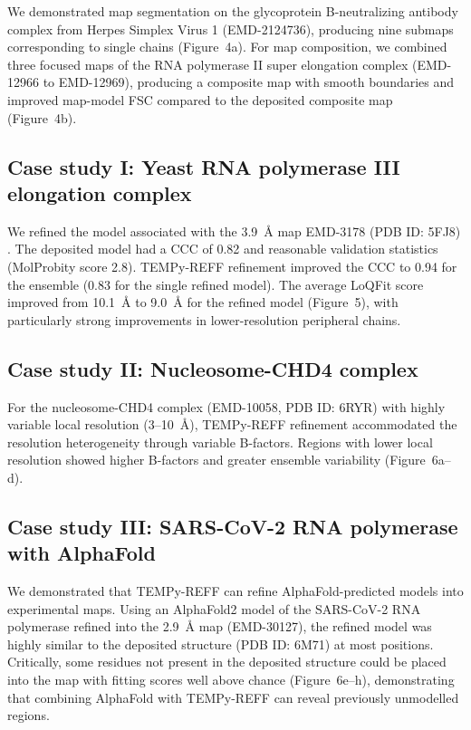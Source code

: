 \documentclass[11pt]{article}
\begin{document}
We demonstrated map segmentation on the glycoprotein B-neutralizing antibody complex from Herpes Simplex Virus 1 (EMD-2124736), producing nine submaps corresponding to single chains (Figure~4a). For map composition, we combined three focused maps of the RNA polymerase II super elongation complex (EMD-12966 to EMD-12969), producing a composite map with smooth boundaries and improved map-model FSC compared to the deposited composite map (Figure~4b).

\subsection{Case study I: Yeast RNA polymerase III elongation complex}

We refined the model associated with the 3.9~\AA{} map EMD-3178 (PDB ID: 5FJ8) \citep{hoffmann2022}. The deposited model had a CCC of 0.82 and reasonable validation statistics (MolProbity score 2.8). TEMPy-REFF refinement improved the CCC to 0.94 for the ensemble (0.83 for the single refined model). The average LoQFit score improved from 10.1~\AA{} to 9.0~\AA{} for the refined model (Figure~5), with particularly strong improvements in lower-resolution peripheral chains.

\subsection{Case study II: Nucleosome-CHD4 complex}

For the nucleosome-CHD4 complex (EMD-10058, PDB ID: 6RYR) with highly variable local resolution (3--10~\AA{}), TEMPy-REFF refinement accommodated the resolution heterogeneity through variable B-factors. Regions with lower local resolution showed higher B-factors and greater ensemble variability (Figure~6a--d).

\subsection{Case study III: SARS-CoV-2 RNA polymerase with AlphaFold}

We demonstrated that TEMPy-REFF can refine AlphaFold-predicted models \citep{jumper2021} into experimental maps. Using an AlphaFold2 model of the SARS-CoV-2 RNA polymerase refined into the 2.9~\AA{} map (EMD-30127), the refined model was highly similar to the deposited structure (PDB ID: 6M71) at most positions. Critically, some residues not present in the deposited structure could be placed into the map with fitting scores well above chance (Figure~6e--h), demonstrating that combining AlphaFold with TEMPy-REFF can reveal previously unmodelled regions.
\end{document}
